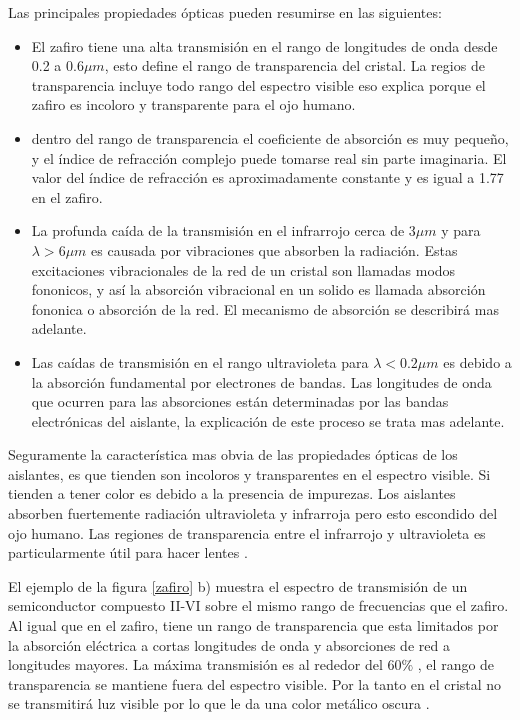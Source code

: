 \documentclass[a4paper,openright,12pt]{book}
\begin{document}
Las principales propiedades ópticas pueden resumirse en las siguientes:
\begin{itemize}
\item El zafiro tiene una alta transmisión en el rango de longitudes de onda desde 0.2 a 0.6$\mu m$, esto define el rango de transparencia del cristal. La regios de transparencia incluye todo rango del espectro visible eso explica porque el zafiro es incoloro y transparente para el ojo humano.
\item dentro del rango de transparencia el coeficiente de absorción es muy pequeño, y el índice de refracción complejo puede tomarse real sin parte imaginaria. El valor del índice de refracción es aproximadamente constante y es igual a 1.77 en el zafiro.
\item La profunda caída de la transmisión en el infrarrojo cerca de 3$\mu m$ y para $\lambda >6\mu m$ es causada por vibraciones que absorben la radiación. Estas excitaciones vibracionales de la red de un cristal son llamadas modos fononicos, y así la absorción vibracional en un solido es llamada absorción fononica o absorción de la red. El mecanismo de absorción se describirá mas adelante.
\item Las caídas de transmisión en el rango ultravioleta para $\lambda<0.2\mu m$ es debido a la absorción fundamental por electrones de bandas. Las longitudes de onda que ocurren para las absorciones están determinadas por las bandas electrónicas del aislante, la explicación de este proceso se trata mas adelante.
\end{itemize}

Seguramente la característica mas obvia de las propiedades ópticas de los aislantes, es  que tienden son incoloros y transparentes en el espectro visible. Si tienden a tener color es debido a la presencia de impurezas. Los aislantes absorben fuertemente radiación ultravioleta y infrarroja pero esto escondido del ojo humano. Las regiones de transparencia entre el infrarrojo y ultravioleta es particularmente útil para hacer lentes \cite{SolidStatePhysics}.

El ejemplo de la figura \ref{zafiro} b) muestra el espectro de transmisión de un semiconductor compuesto II-VI sobre el mismo rango de frecuencias que el zafiro. Al igual que en el zafiro, tiene un rango de transparencia que esta limitados por la absorción eléctrica a cortas longitudes de onda y absorciones de red a longitudes mayores. La máxima transmisión es al rededor del $60\%$ ,  el rango de transparencia se mantiene fuera del espectro visible. Por la tanto en el cristal no se transmitirá luz visible por lo que le da una color metálico oscura \cite{MarkFox}.
\end{document}
